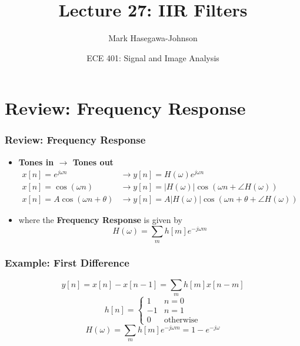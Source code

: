 \documentclass{beamer}
\title{Lecture 27: IIR Filters}
\author{Mark Hasegawa-Johnson}
\date{ECE 401: Signal and Image Analysis}
\begin{document}
\begin{frame}
  \maketitle
\end{frame}

\begin{frame}
  \tableofcontents
\end{frame}

\section[Review]{Review: Frequency Response}
\setcounter{subsection}{1}

\begin{frame}
  \frametitle{Review: Frequency Response}
  \begin{itemize}
  \item {\bf Tones in $\rightarrow$ Tones out}
    \begin{align*}
      x[n]=e^{j\omega n} &\rightarrow y[n]=H(\omega)e^{j\omega n}\\
      x[n]=\cos\left(\omega n\right)
      &\rightarrow y[n]=|H(\omega)|\cos\left(\omega n+\angle H(\omega)\right)\\
      x[n]=A\cos\left(\omega n+\theta\right)
      &\rightarrow y[n]=A|H(\omega)|\cos\left(\omega n+\theta+\angle H(\omega)\right)
    \end{align*}
  \item where the {\bf Frequency Response} is given by
    \[
    H(\omega) = \sum_m h[m]e^{-j\omega m}
    \]
  \end{itemize}
\end{frame}  

\begin{frame}
  \frametitle{Example: First Difference}

  \begin{displaymath}
    y[n] = x[n]-x[n-1] = \sum_m h[m] x[n-m]
  \end{displaymath}
  \begin{displaymath}
    h[n] =\begin{cases}
    1 & n=0\\
    -1 & n=1\\
    0&\mbox{otherwise}
    \end{cases}
  \end{displaymath}
  \begin{displaymath}
    H(\omega) = \sum_m h[m]e^{-j\omega m} = 1-e^{-j\omega}
  \end{displaymath}
\end{frame}
\end{document}
